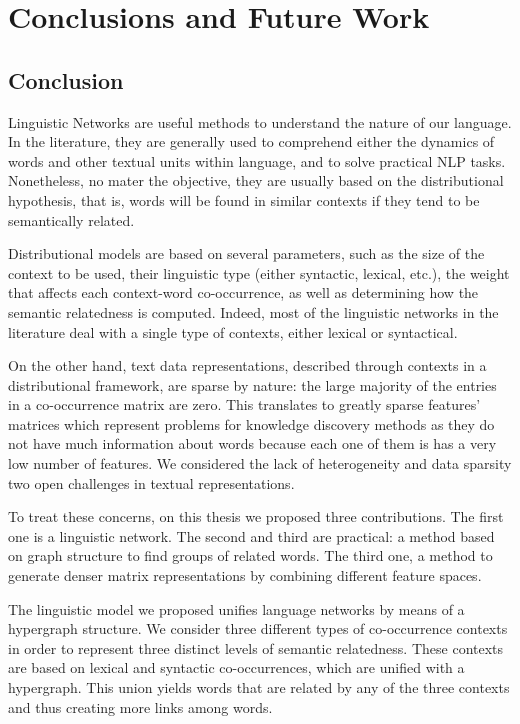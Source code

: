 \chapter{Conclusions and Future Work}
\label{chap:conclusions}
\section{Conclusion}
Linguistic Networks are useful methods to understand the nature of our language. In the literature, they are generally used to comprehend either the dynamics of words and other textual units within language, and to solve practical NLP tasks. Nonetheless, no mater the objective, they are usually based on the distributional hypothesis, that is, words will be found in similar contexts if they tend to be semantically related.

Distributional models are based on several parameters, such as the size of the context to be used, their linguistic type (either syntactic, lexical, etc.), the weight that affects each context-word co-occurrence, as well as determining how the semantic relatedness is computed. Indeed, most of the linguistic networks in the literature deal with a single type of contexts, either lexical or syntactical.

On the other hand, text data representations, described through contexts in a distributional framework, are sparse by nature: the large majority of the entries in a co-occurrence matrix are zero. This translates to greatly sparse features' matrices which represent problems for knowledge discovery methods as they do not have much information about words because each one of them is has a very low number of features. We considered the lack of heterogeneity and data sparsity two open challenges in textual representations.

To treat these concerns, on this thesis we proposed three contributions. The first one is a linguistic network. The second and third are practical: a method based on graph structure to find groups of related words. The third one, a method to generate denser matrix representations by combining different feature spaces.

The linguistic model we proposed unifies language networks by means of a hypergraph structure. We consider three different types of co-occurrence contexts in order to represent three distinct levels of semantic relatedness. These contexts are based on lexical and syntactic co-occurrences, which are unified with a hypergraph. This union yields words that are related by any of the three contexts and thus creating more links among words. 

